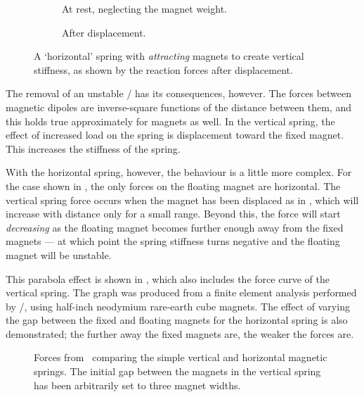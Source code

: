 \documentclass[11pt,a4paper]{memoir}
\begin{document}
\begin{figure}
  \begin{subfigure}
    \caption{At rest, neglecting the magnet weight.}
  \end{subfigure}
  \begin{subfigure}
    \caption{After displacement.}
  \end{subfigure}
  \caption[`Horizontal' spring.]{A `horizontal' spring with \emph{attracting}
magnets to create vertical stiffness, as shown by the reaction forces after
displacement.}
\end{figure}

The removal of an unstable \dof/ has its consequences, however.
The forces between magnetic dipoles are inverse-square functions of the distance between them, and this holds true approximately for magnets as well.
In the vertical spring, the effect of increased load on the spring is displacement toward the fixed magnet.
This increases the stiffness of the spring.

With the horizontal spring, however, the behaviour is a little more complex.
For the case shown in , the only forces on the floating magnet are horizontal.
The vertical spring force occurs when the magnet has been displaced as in , which will increase with distance only for a small range.
Beyond this, the force will start \emph{decreasing} as the floating magnet becomes further enough away from the fixed magnets — at which point the spring stiffness turns negative and the floating magnet will be unstable.

This parabola effect is shown in , which also includes the force curve of the vertical spring.
The graph was produced from a finite element analysis performed by \ANSYS/, using half-inch neodymium rare-earth cube magnets.
The effect of varying the gap between the fixed and floating magnets for the horizontal spring is also demonstrated; the further away the fixed magnets are, the weaker the forces are.

\begin{figure}
  \begin{wide}
    \raggedout
    \hfill
    \hfill
    \null
  \end{wide}
  \caption[Spring forces of the vertical \& horizontal springs.]{Forces from
\FEA\ comparing the simple vertical and horizontal magnetic springs.
The initial gap between the magnets in the vertical spring has been arbitrarily
set to three magnet widths.}
\end{figure}
\end{document}
